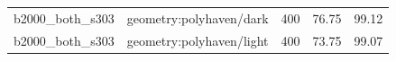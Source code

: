 \begin{longtable}{l>{\raggedright\arraybackslash}p{.42\linewidth}rrr}
b2000\_\allowbreak{}both\_\allowbreak{}s303 & %
geometry:polyhaven/dark & %
400 & %
76.75 & %
99.12 \\ %

b2000\_\allowbreak{}both\_\allowbreak{}s303 & %
geometry:polyhaven/light & %
400 & %
73.75 & %
99.07 \\ %


\end{longtable}
